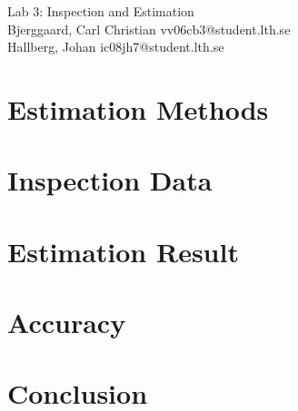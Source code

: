 \documentclass[titlepage]{article}
\begin{document}
\begin{center}
	\huge{Lab 3: Inspection and Estimation } \\
	\small{Bjerggaard, Carl Christian vv06cb3@student.lth.se \\Hallberg, Johan ic08jh7@student.lth.se}

\vspace*{1cm}

\end{center}

\thispagestyle{empty}

\clearpage
\section{Estimation Methods}
\label{methods}

\section{Inspection Data}
\label{inspection}

\section{Estimation Result}

\section{Accuracy}

\section{Conclusion}

\end{document}
